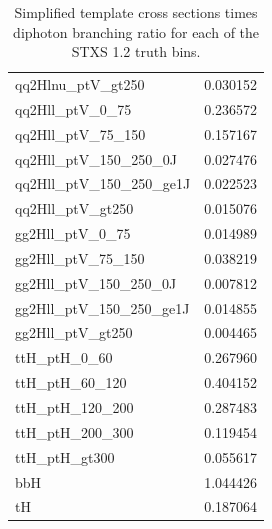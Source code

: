 \begin{table}[htbp]
{\begin{tabular}{lS}
                qq2Hlnu\_ptV\_gt250                                    & 0.030152                                     \\
                qq2Hll\_ptV\_0\_75                                     & 0.236572                                     \\
                qq2Hll\_ptV\_75\_150                                   & 0.157167                                     \\
                qq2Hll\_ptV\_150\_250\_0J                              & 0.027476                                     \\
                qq2Hll\_ptV\_150\_250\_ge1J                            & 0.022523                                     \\
                qq2Hll\_ptV\_gt250                                     & 0.015076                                     \\
                gg2Hll\_ptV\_0\_75                                     & 0.014989                                     \\
                gg2Hll\_ptV\_75\_150                                   & 0.038219                                     \\
                gg2Hll\_ptV\_150\_250\_0J                              & 0.007812                                     \\
                gg2Hll\_ptV\_150\_250\_ge1J                            & 0.014855                                     \\
                gg2Hll\_ptV\_gt250                                     & 0.004465                                     \\
                ttH\_ptH\_0\_60                                        & 0.267960                                     \\
                ttH\_ptH\_60\_120                                      & 0.404152                                     \\
                ttH\_ptH\_120\_200                                     & 0.287483                                     \\
                ttH\_ptH\_200\_300                                     & 0.119454                                     \\
                ttH\_ptH\_gt300                                        & 0.055617                                     \\
                bbH                                                    & 1.044426                                     \\
                tH                                                     & 0.187064                                     \\
                \hline
        \end{tabular}
        }
        \caption{Simplified template cross sections times diphoton branching ratio for each of the STXS 1.2 truth bins.}
        \label{tab:STXS_cross_sections}
\end{table}

